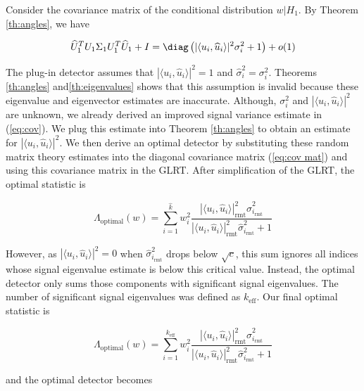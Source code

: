 Consider the covariance matrix of the conditional distribution $w|H_1$. By Theorem \ref{th:angles}, we have

\begin{equation}\label{eq:cov mat}
\widehat{U}_1^TU_1\Sigma_1 U_1^T\widehat{U}_1+I = \diag\left(|\langle u_i,\widehat{u}_i\rangle|^2\sigma_i^2 + 1\right) + o(1)
\end{equation}

The plug-in detector assumes that $|\langle u_i,\widehat{u}_i\rangle|^2=1$ and $\widehat{\sigma}_i^2=\sigma_i^2$. Theorems \ref{th:angles} and\ref{th:eigenvalues} shows that this assumption is invalid because these eigenvalue and eigenvector estimates are inaccurate. Although, $\sigma_i^2$ and $|\langle u_i,\widehat{u}_i\rangle|^2$ are unknown, we already derived an improved signal variance estimate in (\ref{eq:cov}). We plug this estimate into Theorem \ref{th:angles} to obtain an estimate for $|\langle u_i,\widehat{u}_i\rangle|^2$. We then derive an optimal detector by substituting these random matrix theory estimates into the diagonal covariance matrix (\ref{eq:cov mat}) and using this covariance matrix in the GLRT. After simplification of the GLRT, the optimal statistic is

\begin{equation*}
\Lambda_{\text{optimal}}(w)= \sum_{i=1}^{\widehat{k}}w_i^2\frac{|\langle u_i,\widehat{u}_i\rangle|^2_{\text{rmt}}\widehat{\sigma}_{i_\text{rmt}}^2}{|\langle u_i,\widehat{u}_i\rangle|^2_{\text{rmt}}\widehat{\sigma}_{i_\text{rmt}}^2 + 1}
\end{equation*}

However, as $|\langle u_i,\widehat{u}_i\rangle|^2=0$ when $\widehat{\sigma}_{i_\text{rmt}}^2$ drops below $\sqrt{c}$, this sum ignores all indices whose signal eigenvalue estimate is below this critical value. Instead, the optimal detector only sums those components with significant signal eigenvalues. The number of significant signal eigenvalues was defined as $k_\text{eff}$. Our final optimal statistic is

\begin{equation}\label{eq:rmt stat}
\boxed{\Lambda_{\text{optimal}}(w)= \sum_{i=1}^{k_\text{eff}}w_i^2\frac{|\langle u_i,\widehat{u}_i\rangle|^2_{\text{rmt}}\widehat{\sigma}_{i_\text{rmt}}^2}{|\langle u_i,\widehat{u}_i\rangle|^2_{\text{rmt}}\widehat{\sigma}_{i_\text{rmt}}^2 + 1}}
\end{equation}

and the optimal detector becomes

